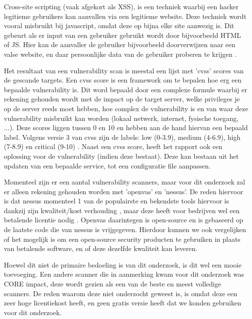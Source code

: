 Cross-site scripting (vaak afgekort als XSS), is een techniek waarbij een hacker legitieme gebruikers kan aanvallen via een legitieme website. Deze techniek wordt vooral misbruikt bij javascript, omdat deze op bijna elke site aanwezig is. Dit gebeurt als er input van een gebruiker gebruikt wordt door bijvoorbeeld HTML of JS. Hier kan de aanvaller de gebruiker bijvoorbeeld doorverwijzen naar een valse website, en daar persoonlijke data van de gebruiker proberen te krijgen \textcite{acunetix-xss}.

Het resultaat van een vulnerability scan is meestal een lijst met 'cvss' scores van de gescande targets. Een cvss score is een framework om te bepalen hoe erg een bepaalde vulnerability is. Dit word bepaald door een complexe formule waarbij er rekening gehouden wordt met de impact op de target server, welke privileges je op de server reeds moet hebben, hoe complex de vulnerability is en van waar deze vulnerability misbruikt kan worden (lokaal netwerk, internet, fysische toegang, ...). Deze scores liggen tussen 0 en 10 en hebben aan de hand hiervan een bepaald label. Volgens versie 3 van cvss zijn de labels: low (0-3.9), medium (4-6.9), high (7-8.9) en critical (9-10) \textcite{Nist}. Naast een cvss score, heeft het rapport ook een oplossing voor de vulnerability (indien deze bestaat). Deze kan bestaan uit het updaten van een bepaalde service, tot een configuratie file aanpassen.

Momenteel zijn er een aantal vulnerability scanners, maar voor dit onderzoek zal er alleen rekening gehouden worden met 'openvas' en 'nessus'. De reden hiervoor is dat nessus momenteel 1 van de populairste en bekendste tools hiervoor is dankzij zijn kwaliteit/kost verhouding \textcite{Sectools}, maar deze heeft voor bedrijven wel een betalende licentie nodig \textcite{Tenable}. Openvas daarintegen is open-source en is gebaseerd op de laatste code die van nessus is vrijgegeven. Hierdoor kunnen we ook vergelijken of het mogelijk is om een open-source security producten te gebruiken in plaats van betalende software, en of deze dezelfde kwaliteit kan leveren. 

Hoewel dit niet de primaire bedoeling is van dit onderzoek, is dit wel een mooie toevoeging. Een andere scanner die in aanmerking kwam voor dit onderzoek was CORE impact, deze wordt gezien als een van de beste en meest volledige scanners. De reden waarom deze niet onderzocht geweest is, is omdat deze een zeer hoge licentiekost heeft, en geen gratis versie heeft dat we konden gebruiken voor dit onderzoek.

